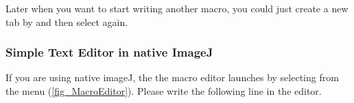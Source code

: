 Later when you want to start writing another macro, you could just create a new tab by  and then select  again.

\subsubsection{Simple Text Editor in native ImageJ}
\label{part:nativeeditor}

If you are using native imageJ, the the macro editor launches by selecting  from the menu (\ref{fig_MacroEditor}). 
Please write the following line in the editor.